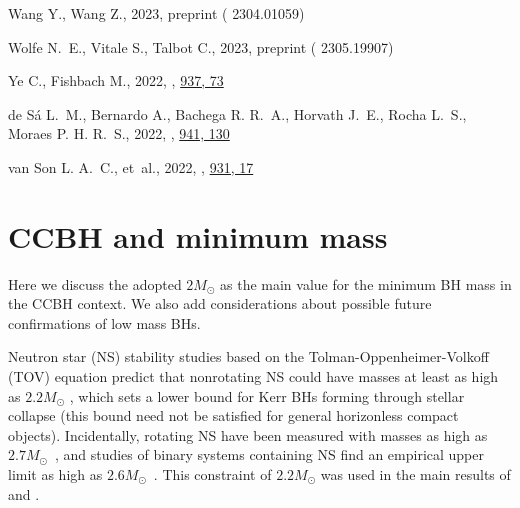 \documentclass[fleqn,usenatbib,useAMS]{mnras}
\begin{document}
\begin{thebibliography}{}
Wang Y.,  Wang Z.,  2023, preprint ( {2304.01059})

Wolfe N.~E.,  Vitale S.,   Talbot C.,  2023, preprint ( {2305.19907})

Ye C.,  Fishbach M.,  2022, , \href {https://ui.adsabs.harvard.edu/abs/2022ApJ...937...73Y} {937, 73}

de S\'a L.~M.,  Bernardo A.,  Bachega R. R.~A.,  Horvath J.~E.,  Rocha L.~S.,   Moraes P. H. R.~S.,  2022, , \href {https://ui.adsabs.harvard.edu/abs/2022ApJ...941..130D} {941, 130}

van Son L. A.~C.,  et~al., 2022, , \href {https://ui.adsabs.harvard.edu/abs/2022ApJ...931...17V} {931, 17}

\makeatother
\end{thebibliography}



\appendix
\section{CCBH and minimum mass} \label{app:minimumMass}

Here we discuss the adopted $2 M_\odot$ as the main value for the minimum BH mass in the CCBH context. We also add considerations about possible future confirmations of low mass BHs. 

Neutron star (NS) stability studies based on the Tolman-Oppenheimer-Volkoff (TOV) equation predict that nonrotating NS could have masses at least as high as $2.2 M_\odot$ \citep{Ye:2022qoe,Legred:2021hdx}, which sets a lower bound for {Kerr} BHs forming through stellar collapse {(this bound need not  be satisfied for general horizonless compact objects)}. Incidentally, rotating NS have been measured with masses as high as $2.7 M_\odot$~\citep{Romani:2012rh}, and studies of binary systems containing NS find an empirical upper limit as high as $2.6 M_\odot$~\citep{Rocha:2021zos}. This constraint of $2.2 M_\odot$ was used in the main results of \citet{Rodriguez:2023gaa} and \citet{Andrae:2023wge}.
\end{document}
